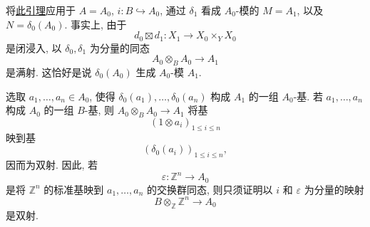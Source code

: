 将\hyperref[lem:sga3-V-4.2]{此引理}应用于 \(A=A_0\), \(i:B\hookrightarrow A_0\),
通过 \(\delta_1\) 看成 \(A_0\)-模的 \(M=A_1\),
以及 \(N=\delta_0(A_0)\). 事实上, 由于
\[
  d_0\boxtimes d_1:X_1\longrightarrow X_0\times_YX_0
\]
是闭浸入, 以 \(\delta_0,\delta_1\) 为分量的同态
\[
  A_0\otimes_BA_0\longrightarrow A_1
\]
是满射. 这恰好是说 \(\delta_0(A_0)\) 生成 \(A_0\)-模 \(A_1\).

选取 \(a_1,\ldots,a_n\in A_0\), 使得
\(\delta_0(a_1),\ldots,\delta_0(a_n)\) 构成 \(A_1\)
的一组 \(A_0\)-基. 若 \(a_1,\ldots,a_n\) 构成 \(A_0\)
的一组 \(B\)-基, 则 \(A_0\otimes_BA_0\to A_1\) 将基
\[
  (1\otimes a_i)_{1\leq i\leq n}
\]
映到基
\[
  (\delta_0(a_i))_{1\leq i\leq n},
\]
因而为双射. 因此, 若
\[
  \varepsilon:\mathbb Z^n\longrightarrow A_0
\]
是将 \(\mathbb Z^n\) 的标准基映到 \(a_1,\ldots,a_n\)
的交换群同态, 则只须证明以 \(i\) 和 \(\varepsilon\) 为分量的映射
\[
  B\otimes_{\mathbb Z}\mathbb Z^n\longrightarrow A_0
\]
是双射.

